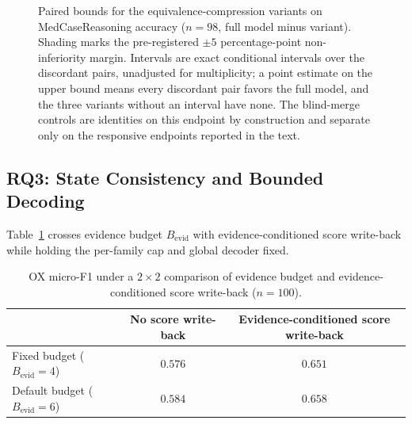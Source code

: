 \documentclass[letterpaper]{article} %
\begin{document}
\begin{figure}[t]
\caption{Paired bounds for the equivalence-compression variants on MedCaseReasoning accuracy ($n{=}98$, full model minus variant). Shading marks the pre-registered $\pm5$ percentage-point non-inferiority margin. Intervals are exact conditional intervals over the discordant pairs, unadjusted for multiplicity; a point estimate on the upper bound means every discordant pair favors the full model, and the three variants without an interval have none. The blind-merge controls are identities on this endpoint by construction and separate only on the responsive endpoints reported in the text.}
\label{fig:bounds}
\end{figure}

\subsection{RQ3: State Consistency and Bounded Decoding}
\label{sec:res-state}

Table~\ref{tab:state-2x2} crosses evidence budget $B_{\mathrm{evid}}$ with evidence-conditioned score write-back while holding the per-family cap and global decoder fixed.

\begin{table}[t]
\centering
\small
\begin{tabular}{lcc}
\toprule
 & No score write-back & Evidence-conditioned score write-back \\
\midrule
Fixed budget ($B_{\mathrm{evid}}{=}4$) & $0.576$ & $\mathbf{0.651}$ \\
Default budget ($B_{\mathrm{evid}}{=}6$) & $0.584$ & $0.658$ \\
\bottomrule
\end{tabular}
\caption{OX micro-F1 under a $2{\times}2$ comparison of evidence budget and evidence-conditioned score write-back ($n{=}100$).}
\label{tab:state-2x2}

\end{table}
\end{document}
